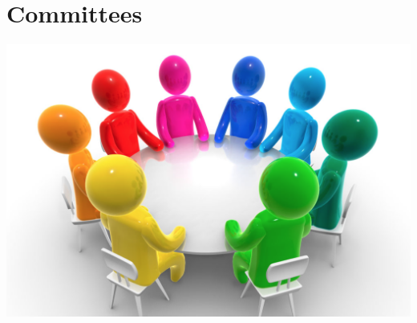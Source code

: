\documentclass[
letterpaper, %
11pt, %
twoside,
onecolumn, %
openright, %
]{report}
\begin{document}
                                            
\chapter{Committees} 
\vspace{3em}
\begin{minipage}[c]{\linewidth}
\centering
\includegraphics[width=\linewidth]{Committees/committee.png}
\end{minipage}

 


% 
% 
% 
% 
% 

%
\end{document}
